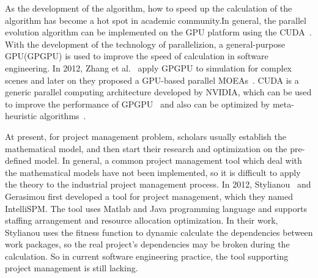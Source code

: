 As the development of the algorithm, how to speed up the calculation of the algorithm
has become a hot spot in academic community.In general, the parallel evolution algorithm can be implemented on the GPU platform using the CUDA~\cite{vidal}. With the development of the technology of parallelizion, a general-purpose GPU(GPGPU) is used 
to improve the speed of calculation in software engineering. In 2012, Zhang et al.~\cite{zhang} apply GPGPU to
simulation for complex scenes and later on they proposed a GPU-based parallel MOEAs~\cite{li}.
CUDA is a generic parallel computing architecture developed by NVIDIA, which can be used to improve the performance of GPGPU~\cite{langdon2} and also can be optimized by meta-heuristic algorithms~\cite{langdon1}.


At present, for project management problem, scholars usually establish the
mathematical model, and then start their research and optimization on the
pre-defined model. In general, a common project management tool which deal with
the mathematical models have not been implemented, so it is difficult to apply
the theory to the industrial project management process. In 2012, Stylianou~\cite{stylianou} and
Gerasimou first developed a tool for project management, which they named
IntelliSPM. The tool uses Matlab and Java programming language and 
supports staffing arrangement and resource allocation optimization. In
their work, Stylianou uses the fitness function to dynamic calculate the
dependencies between work packages, so the real project's dependencies may be
broken during the calculation. So in current software engineering practice, the
tool supporting project management is still lacking.

